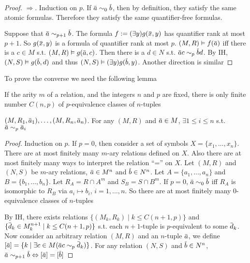 \documentclass[11pt]{article}
\begin{document}
\begin{proof}
\(\Rightarrow\). Induction on \(p\). If \(\bara\sim_0\barb\), then by definition, they satisfy the same
atomic formulas. Therefore they satisfy the same quantifier-free formulas.

Suppose that \(\bara\sim_{p+1}\barb\). The formula \(f:=(\exists y)g(\barx,y)\) has quantifier rank at
most \(p+1\). So \(g(\barx,y)\) is a formula of quantifier rank at
most \(p\). \((M,R)\vDash f(\bara)\) iff there is a \(c\in M\) s.t. \((M,R)\vDash g(\bara,c)\). Then there
is a \(d\in N\) s.t. \(\bara c\sim_p\barb d\). By IH, \((N,S)\vDash g(\barb,d)\) and
thus \((N,S)\vDash(\exists y)g(\barb,y)\). Another direction is similar
\end{proof}

To prove the converse we need the following lemma

\begin{lemma}[]
If the arity \(m\) of a relation, and the integers \(n\) and \(p\) are fixed, there is only
finite number \(C(n,p)\) of \(p\)-equivalence classes of \(n\)-tuples
\end{lemma}

\((M,R_1,\bara_1),\dots,(M,R_n,\bara_n)\). For any \((M,R)\) and \(\bara\in M\), \(\exists 1\le i\le n\) s.t. \(\bara\sim_p\bara_i\)

\begin{proof}
Induction on \(p\). If \(p=0\), then consider a set of symbols \(X=\{x_1,\dots,x_n\}\). There are at
most finitely many \(m\)-ary relations defined on \(X\). Also there are at most finitely many
ways to interpret the relation ``='' on \(X\). Let \((M,R)\) and \((N,S)\) be \(m\)-ary
relations, \(\bara\in M^n\) and \(\barb\in N^n\). Let \(A =\{a_1,\dots,a_n\}\) and \(B =\{b_1,\dots,b_n\}\).
Let \(R_A =R\cap A^m\) and \(S_B =S\cap B^m\). If \(p=0\), \(\bara\sim_0\barb\) iff \(R_A\) is isomorphic
to \(R_B\) via \(a_i\mapsto b_i\), \(i=1,\dots,n\). So there are at most finitely many 0-equivalence classes
of \(n\)-tuples

By IH, there exists relations \(\{(M_k,R_k)\mid k\le C(n+1,p)\}\)
and \(\{\bard_k\in M_k^{n+1}\mid k\le C(n+1,p)\}\) s.t. each \(n+1\)-tuple is \(p\)-equivalent to
some \(\bard_k\). Now consider an arbitrary relation \((M,R)\) and an \(n\)-tuple \(\bara\), we
define \([\bara]=\{k\mid\exists c\in M(\bara c\sim_p\bard_k)\}\). For any relation \((N,S)\)
and \(\barb\in N^n\), \(\bara\sim_{p+1}\barb\Leftrightarrow[\bara]=[\barb]\)
\end{proof}
\end{document}

